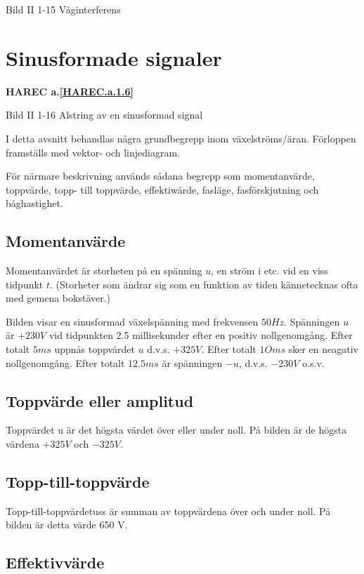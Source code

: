 Bild II 1-15 Våginterferens

\cleardoublepage

\section{Sinusformade signaler}
\textbf{HAREC a.\ref{HAREC.a.1.6}\label{myHAREC.a.1.6}}

Bild II 1-16 Alstring av en sinusformad signal

I detta avsnitt behandlas några grundbegrepp inom växelströms/äran. Förloppen
framställs med vektor- och linjediagram.

För närmare beskrivning används sådana begrepp som momentanvärde, toppvärde, topp- till
toppvärde, effektiwärde, fasläge, fasförskjutning och båghastighet.

\subsection{Momentanvärde}

Momentanvärdet är storheten på en spänning $u$, en ström i etc. vid en viss tidpunkt $t$.
(Storheter som ändrar sig som en funktion av tiden kännetecknas ofta med gemena bokstäver.)

Bilden visar en sinusformad växelspänning med frekvensen $50 Hz$. Spänningen $u$ är $+230 V$ vid tidpunkten 2.5 millisekunder efter en positiv nollgenomgång. Efter totalt $5 ms$
uppnås toppvärdet $u$ d.v.s. $+325 V$. Efter totalt $1O ms$ sker en neagativ
nollgenomgång. Efter totalt $12.5 ms$ är spänningen $-u$, d.v.s. $-230 V$ o.s.v.

\subsection{Toppvärde eller amplitud}

Toppvärdet u är det högsta värdet över eller under noll. På bilden är de högsta
värdena $+325 V$ och $-325 V$.

\subsection{Topp-till-toppvärde}

Topp-till-toppvärdetuss är summan av toppvärdena över och under noll. På bilden är
detta värde 650 V.

\subsection{Effektivvärde}

